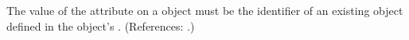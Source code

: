 The value of the attribute  on a \Model object must
be the identifier of an existing \Parameter object defined in the \Model
object's \ListOfParameters.  (References: .)

